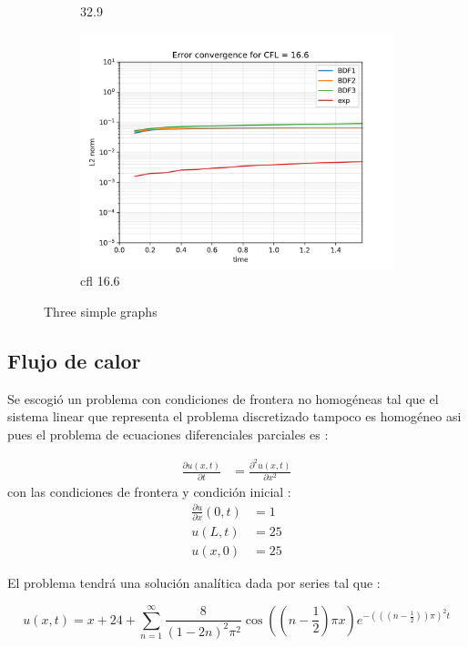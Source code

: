 \documentclass[12pt]{article}
\begin{document}
\begin{figure}
\begin{subfigure}[b]{0.3\textwidth}
		\caption{32.9}
		\label{fig:l2normcfl32}
	\end{subfigure}
	\begin{subfigure}[b]{0.3\textwidth}
		\centering
		\includegraphics[width=0.7\linewidth]{res/homogeneo/L2norm_CFL_16.6}
		\caption{cfl 16.6}
		\label{fig:l2normcfl16}
	\end{subfigure}
	\caption{Three simple graphs}
	\label{fig:three graphs}
\end{figure}









\subsection{Flujo de calor }
Se escogió un problema con condiciones de frontera no homogéneas tal que el sistema linear que representa el problema discretizado tampoco es homogéneo asi pues el problema de ecuaciones diferenciales parciales es : 


\begin{align}	\frac{\partial u\left(  x,t\right)  }{\partial t}  & =\frac{\partial^{2}u(  x,t) }{\partial x^{2}}
\end{align}
con las condiciones de frontera y condición inicial  : 
\begin{align}
	\frac{\partial u}{\partial x}\left(  0,t\right)    & =1\\
	u\left(  L,t\right)    & =25\\
	u\left(  x,0\right)    & =25
\end{align} 

El problema tendrá una solución analítica dada por series  tal que : 

\begin{equation}
	u(x,t)  =x+24+\sum_{n=1}^{\infty}\frac{8}{\left(  1-2n\right)
		^{2}\pi^{2}}\cos\left(  \left(  n-\frac{1}{2}\right)  \pi x\right)
	e^{-\left(  \left(  (n-\frac{1}{2})\right)  \pi\right)  ^{2}t}
\end{equation}
\end{document}
